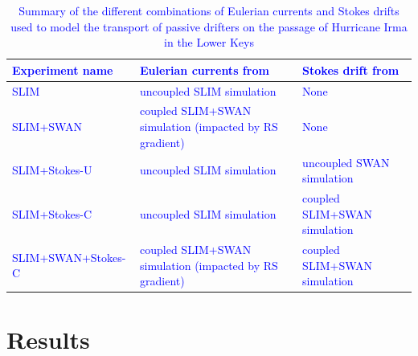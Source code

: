 \documentclass[preprint,12pt,authoryear]{elsarticle}
\newcommand{\modif}[1]{\textcolor{blue}{#1}}
\begin{document}
\begin{table}
    \centering
\modif{
    \begin{tabular}{|p{4.5cm}|p{4cm}|p{4cm}|}
        \hline
        \textbf{Experiment name} & \textbf{Eulerian currents from} &  \textbf{Stokes drift from}\\ \hline
        SLIM               & uncoupled SLIM simulation & None \\ \hline
        SLIM+SWAN          & coupled SLIM+SWAN simulation (impacted by RS gradient) & None \\ \hline
        SLIM+Stokes-U      & uncoupled SLIM simulation & uncoupled SWAN simulation \\ \hline
        SLIM+Stokes-C      & uncoupled SLIM simulation & coupled SLIM+SWAN simulation \\ \hline
        SLIM+SWAN+Stokes-C & coupled SLIM+SWAN simulation (impacted by RS gradient) & coupled SLIM+SWAN simulation \\ \hline
    \end{tabular}
}
    \caption{Summary of the different combinations of Eulerian currents and Stokes drifts used to model the transport of passive drifters on the passage of Hurricane Irma in the Lower Keys}
    \label{tab:summary}
\end{table}

\section{Results}
\end{document}
